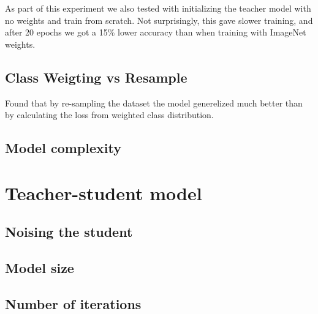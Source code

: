 \documentclass[thesis.tex]{subfiles}
\begin{document}

As part of this experiment we also tested with initializing the teacher model with no weights and train from scratch. Not surprisingly, this gave slower training, and after 20 epochs we got a 15\% lower accuracy than when training with ImageNet weights.



\subsection{Class Weigting vs Resample}
Found that by re-sampling the dataset the model generelized much better than by calculating the loss from weighted class distribution.




\subsection{Model complexity}






\section{Teacher-student model}



\subsection{Noising the student}



\subsection{Model size}





\subsection{Number of iterations}
\end{document}
